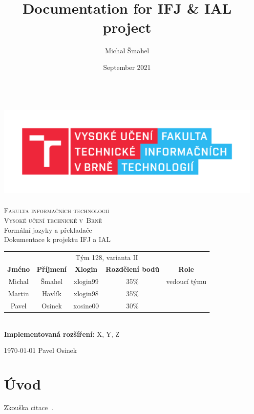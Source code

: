 \documentclass[11pt,a4paper]{article}
\title{Documentation for IFJ \& IAL project}
\author{Michal Šmahel}
\date{September 2021}
\begin{document}
\begin{titlepage}
    \begin{center}
        \includegraphics[height = 160pt]{images/FIT_logo.pdf}\\
		
		{\Huge \textsc{Fakulta informačních technologií}\\[5pt]}
		{\Huge \textsc{Vysoké učení technické v~Brně}}\\
		{\LARGE Formální jazyky a překladače\\[5pt]}
		{\LARGE Dokumentace k projektu IFJ a IAL\\[30pt]}
		
		\begin{tabular}{c c c c c}
		    \multicolumn{5}{c}{Tým 128, varianta II}\\[5pt]
            \textbf{Jméno} & \textbf{Příjmení} & \textbf{Xlogin} & \textbf{Rozdělení bodů} & \textbf{Role}\\
            \hline
            Michal & Šmahel & xlogin99 & 35\% & vedoucí týmu \\[5pt]
            Martin & Havlík & xlogin98 & 35\% &\\[5pt]
            Pavel  & Osinek & xosine00 & 30\% & 
        \end{tabular}\\[30pt]
        \textbf{Implementovaná rozšíření:} X, Y, Z
    \end{center}
    {
		\today
		\hfill
		Pavel Osinek
	}
\end{titlepage}

\newpage
\tableofcontents
\newpage

\section{Úvod}
    Zkouška citace~\cite{MedunaAlexander2008Eocd}.
    
\end{document}
